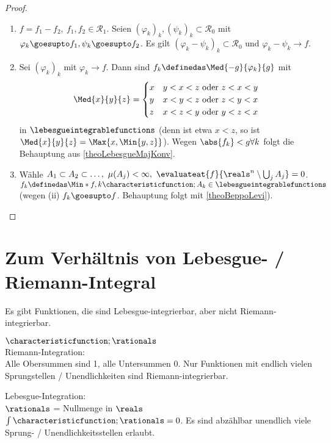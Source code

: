 \begin{proof}\ 
    
    \begin{enumerate}
        \item \(f=f_1-f_2,\ f_1,f_2\in\mathcal{R_1}\). Seien \((\varphi_k)_k,(\psi_k)_k\subset \mathcal{R_0}\) mit \(\varphi_k\goesupto f_1,\psi_k\goesupto f_2\).
        Es gilt \((\varphi_k-\psi_k)_k\subset\mathcal{R_0}\) und \(\varphi_k-\psi_k\to f\).
        
        \item Sei \((\varphi_k)_k\) mit \(\varphi_k\to f\). Dann sind \(f_k\definedas \Med{-g}{\varphi_k}{g}\) mit 
        \begin{equation*}
          \Med{x}{y}{z}=\begin{cases}
                x & y<x<z\text{ oder } z<x<y\\
                y & x<y<z\text{ oder } z<y<x\\
                z & x<z<y\text{ oder } y<z<x\\
            \end{cases}
        \end{equation*}
        in \(\lebesgueintegrablefunctions\) (denn ist etwa \(x<z\), so ist \(\Med{x}{y}{z}=\Max{x,\Min{y,z}}\)).
        Wegen \(\abs{f_k}<g\forall k\) folgt die Behauptung aus \ref{theoLebesgueMajKonv}.
        \item Wähle \(A_1\subset A_2\subset\ldots,\ \mu(A_j)<\infty,\ \evaluateat{f}{\reals^n\setminus \bigcup_j A_j}=0\).
        \(f_k\definedas \Min*{f,k\characteristicfunction;{A_k}}\in \lebesgueintegrablefunctions\) (wegen (ii) \(f_k\goesupto f\). Behauptung folgt mit \ref{theoBeppoLevi}).
    \end{enumerate}
\end{proof}


\section*{Zum Verhältnis von Lebesgue- / Riemann-Integral}

Es gibt Funktionen, die sind Lebesgue-integrierbar, aber nicht Riemann-integrierbar.
\begin{beispiel}
    \(\characteristicfunction;{\rationals}\)\\
    Riemann-Integration:\\
        Alle Obersummen sind 1, alle Untersummen 0. Nur Funktionen mit endlich vielen Sprungstellen / Unendlichkeiten sind Riemann-integrierbar.

    Lebesgue-Integration:\\
        \( \rationals \) = Nullmenge in \( \reals \)\timplies\(\int\characteristicfunction;{\rationals}=0\). Es sind abzählbar unendlich viele Sprung- / Unendlichkeitsstellen erlaubt.
\end{beispiel}

